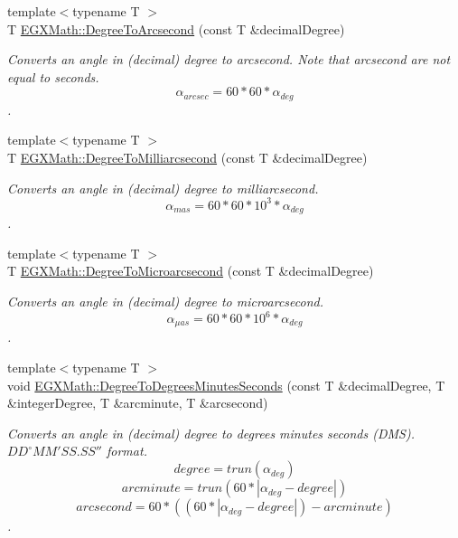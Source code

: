 \begin{DoxyCompactItemize}
{\footnotesize template$<$typename T $>$ }\\T \mbox{\hyperlink{group___e_g_x_math-_conversions-_angle_conversions-_degree_gaf85e2d765c248f447854a807a68a5de8}{E\+G\+X\+Math\+::\+Degree\+To\+Arcsecond}} (const T \&decimal\+Degree)
\begin{DoxyCompactList}\small\item\em Converts an angle in (decimal) degree to arcsecond. Note that arcsecond are not equal to seconds. \[\alpha_{arcsec}=60 * 60 * \alpha_{deg}\]. \end{DoxyCompactList}\item 
{\footnotesize template$<$typename T $>$ }\\T \mbox{\hyperlink{group___e_g_x_math-_conversions-_angle_conversions-_degree_ga2c218e286b2ef72a00734dbc5a7f5ab6}{E\+G\+X\+Math\+::\+Degree\+To\+Milliarcsecond}} (const T \&decimal\+Degree)
\begin{DoxyCompactList}\small\item\em Converts an angle in (decimal) degree to milliarcsecond. \[\alpha_{mas}=60 * 60 * 10^3 * \alpha_{deg} \]. \end{DoxyCompactList}\item 
{\footnotesize template$<$typename T $>$ }\\T \mbox{\hyperlink{group___e_g_x_math-_conversions-_angle_conversions-_degree_ga31b65388fe1b4656663b3d66b9d764e6}{E\+G\+X\+Math\+::\+Degree\+To\+Microarcsecond}} (const T \&decimal\+Degree)
\begin{DoxyCompactList}\small\item\em Converts an angle in (decimal) degree to microarcsecond. \[\alpha_{\mu as}=60 * 60 * 10^6 * \alpha_{deg}\]. \end{DoxyCompactList}\item 
{\footnotesize template$<$typename T $>$ }\\void \mbox{\hyperlink{group___e_g_x_math-_conversions-_angle_conversions-_degree_ga859585939255d52d010c780c68eb6e23}{E\+G\+X\+Math\+::\+Degree\+To\+Degrees\+Minutes\+Seconds}} (const T \&decimal\+Degree, T \&integer\+Degree, T \&arcminute, T \&arcsecond)
\begin{DoxyCompactList}\small\item\em Converts an angle in (decimal) degree to degrees minutes seconds (D\+MS). ${DD}^{\circ}{MM}'{SS.SS}''$ format. \[degree=trun(\alpha_{deg})\] \[arcminute=trun(60 * |\alpha_{deg} - degree|)\] \[arcsecond=60 * ((60 * |\alpha_{deg} - degree|)-arcminute)\]. \end{DoxyCompactList}\item 

\end{DoxyCompactItemize}
